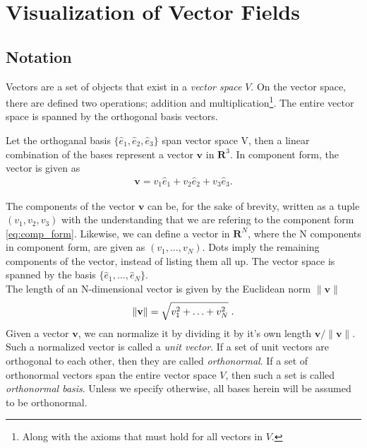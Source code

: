 \documentclass[main.tex]{subfiles}
\begin{document}
\appendix

\section{Visualization of Vector Fields}
\label{sec:vis_vec_field}

\subsection{Notation}
Vectors are a set of objects that exist in a \emph{vector space} $V$. On the vector space, 
there are defined two operations; addition and multiplication\footnote{Along with the axioms
that must hold for all vectors in $V$.}. The entire vector space is spanned by the orthogonal 
basis vectors. 

\begin{mydef}
Let the orthoganal basis $\{\hat{e}_1,\hat{e}_2,\hat{e}_3\}$ span vector space V,
then a linear combination of the bases represent a vector $\mathbf{v}$ in $\mathbf{R}^3$.
In component form, the vector is given as
\begin{align} \label{eq:comp_form}
\mathbf{v} = v_1\hat{e}_1 + v_2\hat{e}_2 + v_3\hat{e}_3.
\end{align}
\end{mydef}

\hspace{-6mm}The components of the vector $\mathbf{v}$ can be, for the sake of brevity, written 
as a tuple $(v_1,v_2,v_3)$ with the understanding\cite{Hei01} that we are refering to the component form 
\eqref{eq:comp_form}. Likewise, we can define a vector in $\mathbf{R}^N$, where the N components
in component form, are given as  $(v_1,\hdots,v_N)$. Dots imply the remaining components 
of the vector, instead of listing them all up. The vector space is spanned by the basis 
$\{\hat{e}_1,\hdots,\hat{e}_N\}$.
\\

The length of an N-dimensional vector is given by the Euclidean norm $\lVert{\mathbf{v}\rVert}$
\begin{align}
\label{euclidnorm}
\lVert{\mathbf{v}\rVert} = \sqrt{v_1^2 + \hdots + v_N^2} \hspace{1mm}.
\end{align}
Given a vector $\mathbf{v}$, we can normalize it by dividing it by it's own length
$\mathbf{v}/\lVert{\mathbf{v}\rVert}$. Such a normalized vector is called a \emph{unit vector}.
If a set of unit vectors are orthogonal to each other, then they are called \emph{orthonormal}.
If a set of orthonormal vectors span the entire vector space $V$, then such a set is called
\emph{orthonormal basis}. Unless we specify otherwise, all bases herein will be assumed 
to be orthonormal. 
\\
\end{document}
